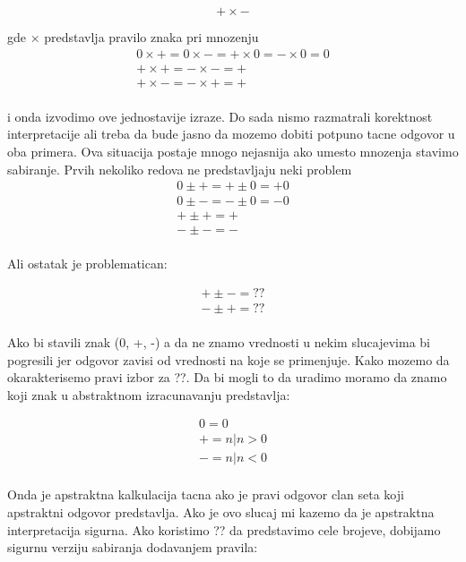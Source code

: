 \begin{equation}
  + \times -
\end{equation}

gde $\times$ predstavlja pravilo znaka pri mnozenju \\

\begin{multline}
  	0 \times + = 0 \times - = + \times 0 = - \times 0 = 0 \\
  	+ \times + = - \times - = + \\
  	+ \times - = - \times + = + \\
\end{multline}

i onda izvodimo ove jednostavije izraze. Do sada nismo razmatrali korektnost interpretacije ali treba da bude jasno da mozemo dobiti potpuno tacne odgovor u oba primera. Ova situacija postaje mnogo nejasnija ako umesto mnozenja stavimo sabiranje. Prvih nekoliko redova ne predstavljaju neki problem \\

\begin{multline}
	0 \pm + = + \pm 0 = +0 \\ 
	0 \pm - = - \pm 0 = -0 \\ 
	+ \pm + = +  \\ 
	- \pm - = -  \\ 
\end{multline}


Ali ostatak je problematican:

\begin{multline}	
	+ \pm - = ?? \\ 
	- \pm + = ?? \\ 
\end{multline}

Ako bi stavili znak (0, +, -) a da ne znamo vrednosti u nekim slucajevima bi pogresili jer odgovor zavisi od vrednosti na koje se primenjuje. Kako mozemo da okarakterisemo pravi izbor za ??. Da bi mogli to da uradimo moramo da znamo koji znak u abstraktnom izracunavanju predstavlja:

\begin{multline}	
	0 = {0}				\\    
	+ = {n|n > 0}		\\	
	- = {n|n < 0}		\\
\end{multline}

Onda je apstraktna kalkulacija tacna ako je pravi odgovor clan seta koji apstraktni odgovor predstavlja. Ako je ovo slucaj mi kazemo da je apstraktna interpretacija sigurna. Ako koristimo ?? da predstavimo cele brojeve, dobijamo sigurnu verziju sabiranja dodavanjem pravila:

